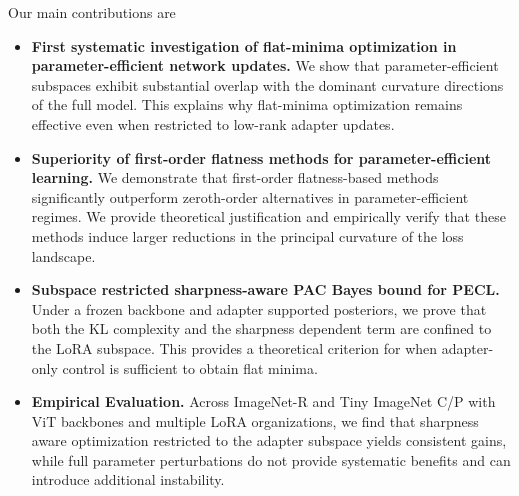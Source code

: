 \documentclass{article}
\theoremstyle{plain}
\theoremstyle{definition}
\theoremstyle{remark}
\begin{document}

Our main contributions are
\begin{itemize}
\item \textbf{First systematic investigation of flat-minima optimization in parameter-efficient network updates.} We show that parameter-efficient subspaces exhibit substantial overlap with the dominant curvature directions of the full model. This explains why flat-minima optimization remains effective even when restricted to low-rank adapter updates.
\item \textbf{Superiority of first-order flatness methods for parameter-efficient learning.} We demonstrate that first-order flatness-based methods significantly outperform zeroth-order alternatives in parameter-efficient regimes. We provide theoretical justification and empirically verify that these methods induce larger reductions in the principal curvature of the loss landscape.

\item \textbf{Subspace restricted sharpness-aware PAC Bayes bound for PECL.} Under a frozen backbone and adapter supported posteriors, we prove that both the KL complexity and the sharpness dependent term are confined to the LoRA subspace. This provides a theoretical criterion for when adapter-only control is sufficient to obtain flat minima.

\item \textbf{Empirical Evaluation.}  Across ImageNet-R and Tiny ImageNet C/P with ViT backbones and multiple LoRA organizations, we find that sharpness aware optimization restricted to the adapter subspace yields consistent gains, while full parameter perturbations do not provide systematic benefits and can introduce additional instability.
\end{itemize}
\end{document}
